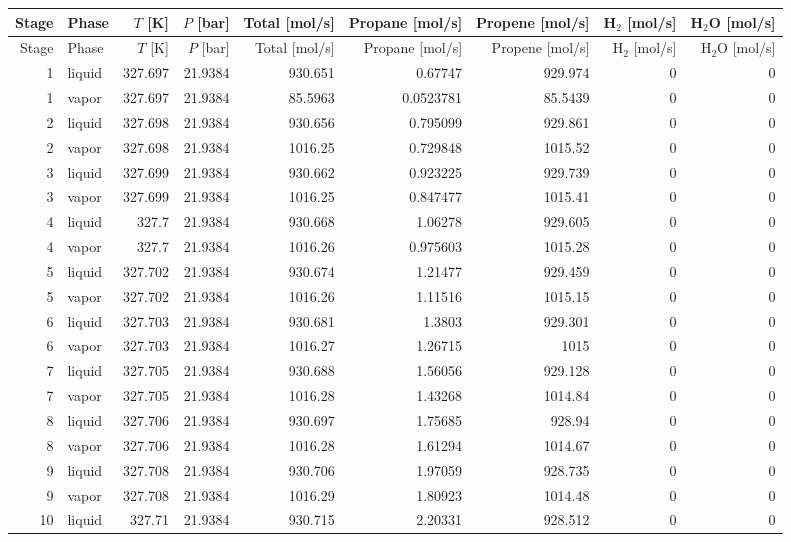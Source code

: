 \begin{longtable}{r l r r r r r r r}
\hline
Stage & Phase & $T$ [K] & $P$ [bar] & Total [mol/s] & Propane [mol/s] & Propene [mol/s] & H$_2$ [mol/s] & H$_2$O [mol/s] \\
\hline
\endfirsthead
\hline
Stage & Phase & $T$ [K] & $P$ [bar] & Total [mol/s] & Propane [mol/s] & Propene [mol/s] & H$_2$ [mol/s] & H$_2$O [mol/s] \\
\hline
\endhead
1 & liquid & 327.697 & 21.9384 & 930.651 & 0.67747 & 929.974 & 0 & 0 \\
1 & vapor & 327.697 & 21.9384 & 85.5963 & 0.0523781 & 85.5439 & 0 & 0 \\
2 & liquid & 327.698 & 21.9384 & 930.656 & 0.795099 & 929.861 & 0 & 0 \\
2 & vapor & 327.698 & 21.9384 & 1016.25 & 0.729848 & 1015.52 & 0 & 0 \\
3 & liquid & 327.699 & 21.9384 & 930.662 & 0.923225 & 929.739 & 0 & 0 \\
3 & vapor & 327.699 & 21.9384 & 1016.25 & 0.847477 & 1015.41 & 0 & 0 \\
4 & liquid & 327.7 & 21.9384 & 930.668 & 1.06278 & 929.605 & 0 & 0 \\
4 & vapor & 327.7 & 21.9384 & 1016.26 & 0.975603 & 1015.28 & 0 & 0 \\
5 & liquid & 327.702 & 21.9384 & 930.674 & 1.21477 & 929.459 & 0 & 0 \\
5 & vapor & 327.702 & 21.9384 & 1016.26 & 1.11516 & 1015.15 & 0 & 0 \\
6 & liquid & 327.703 & 21.9384 & 930.681 & 1.3803 & 929.301 & 0 & 0 \\
6 & vapor & 327.703 & 21.9384 & 1016.27 & 1.26715 & 1015 & 0 & 0 \\
7 & liquid & 327.705 & 21.9384 & 930.688 & 1.56056 & 929.128 & 0 & 0 \\
7 & vapor & 327.705 & 21.9384 & 1016.28 & 1.43268 & 1014.84 & 0 & 0 \\
8 & liquid & 327.706 & 21.9384 & 930.697 & 1.75685 & 928.94 & 0 & 0 \\
8 & vapor & 327.706 & 21.9384 & 1016.28 & 1.61294 & 1014.67 & 0 & 0 \\
9 & liquid & 327.708 & 21.9384 & 930.706 & 1.97059 & 928.735 & 0 & 0 \\
9 & vapor & 327.708 & 21.9384 & 1016.29 & 1.80923 & 1014.48 & 0 & 0 \\
10 & liquid & 327.71 & 21.9384 & 930.715 & 2.20331 & 928.512 & 0 & 0 \\

\end{longtable}
